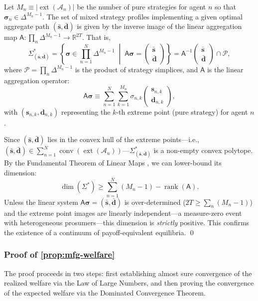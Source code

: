 \documentclass[12pt, notitlepage]{article}
\begin{document}
Let $M_n \equiv |\operatorname{ext}(\mathcal{A}_n)|$ be the number of pure strategies for agent $n$ so that $\boldsymbol{\sigma}_n \in \varDelta^{M_n-1}$. The set of mixed strategy profiles implementing a given optimal aggregate path $(\bar{\mathbf{s}}, \bar{\mathbf{d}})$ is given by the inverse image of the linear aggregation map $\mathsf{A}: \prod_n \varDelta^{M_n-1} \to \mathbb{R}^{2T}$. That is, $$    \Sigma^*_{(\bar{\mathbf{s}}, \bar{\mathbf{d}})} = \left\{ \boldsymbol{\sigma} \in \prod_{n=1}^N \varDelta^{M_n-1} \;\middle|\; \mathsf{A}\boldsymbol{\sigma} = \begin{pmatrix} \bar{\mathbf{s}} \\ \bar{\mathbf{d}} \end{pmatrix} \right\} = \mathsf{A}^{-1} \begin{pmatrix} \bar{\mathbf{s}} \\ \bar{\mathbf{d}} \end{pmatrix}  \cap \mathcal{P},$$
where $\mathcal{P} = \prod_n \varDelta^{M_n-1}$ is the product of strategy simplices, and $\mathsf{A}$ is the linear aggregation operator:
$$    \mathsf{A}\boldsymbol{\sigma} \equiv \sum_{n=1}^N \sum_{k=1}^{M_n} \sigma_{n,k} \begin{pmatrix} \mathbf{s}_{n,k} \\ \mathbf{d}_{n,k} \end{pmatrix},$$
with $(\mathbf{s}_{n,k}, \mathbf{d}_{n,k})$ representing the $k$-th extreme point (pure strategy) for agent $n$.

Since $(\bar{\mathbf{s}}, \bar{\mathbf{d}})$ lies in the convex hull of the extreme points---i.e., $(\bar{\mathbf{s}}, \bar{\mathbf{d}}) \in  \sum_{n=1}^N \operatorname{conv}(\operatorname{ext}(\mathcal{A}_n))$---$ \Sigma^*_{(\bar{\mathbf{s}}, \bar{\mathbf{d}})}$  is a non-empty convex polytope. By the Fundamental Theorem of Linear Maps \citep[e.g., Theorem 3.21 in][]{axler2015linear}, we can lower-bound its dimension:
\[
    \dim(\Sigma^*) \ge \sum_{n=1}^N (M_n - 1) - \operatorname{rank}(\mathsf{A}).
\]
Unless the linear system $\mathsf{A}\boldsymbol{\sigma} = (\bar{\mathbf{s}}, \bar{\mathbf{d}})$ is over-determined ($2T \ge \sum_n (M_n - 1)$) and the extreme point images are linearly independent---a measure-zero event with heterogeneous prosumers---this dimension is \textit{strictly} positive. This confirms the existence of a continuum of payoff-equivalent equilibria. \qed


\subsubsection*{Proof of \cref{prop:mfg-welfare}}
The proof proceeds in two steps: first establishing almost sure convergence of the realized welfare via the Law of Large Numbers, and then proving the convergence of the expected welfare via the Dominated Convergence Theorem.
\end{document}
